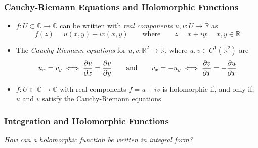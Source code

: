 \documentclass[11pt, a4paper]{article}
\newcommand{\question}[1]{\textit{#1}\vspace{2mm}}
\newcommand{\R}{\mathbb{R}} %
\newcommand{\C}{\mathbb{C}} %
\begin{document}
\subsubsection{Cauchy-Riemann Equations and Holomorphic Functions}
\begin{itemize}
	\item $ f : U \subset \C \to \C $ can be written with \textit{real components} $ u, v : U \to \R $ as
	\begin{equation*}
		f(z) = u(x, y) + iv(x, y) \qquad \text{where} \qquad z = x + iy; \quad x, y \in \R
	\end{equation*}
	
	\item The \textit{Cauchy-Riemann equations} for $ u, v: \R^2 \to \R $, where $ u, v \in C^{1}(\R^{2}) $ are
	\begin{equation*}
		u_{x} = v_{y} \iff \pdv{u}{x} = \pdv{v}{y} \qquad \text{and} \qquad v_{x} = - u_{y} \iff \pdv{v}{x} = -\pdv{u}{x}
	\end{equation*}
	
	\item $ f : U \subset \C \to \C $ with real components $ f = u + iv $ is holomorphic if, and only if, $ u $ and $ v $ satisfy the Cauchy-Riemann equations
\end{itemize}

\subsubsection{Integration and Holomorphic Functions}
\question{How can a holomorphic function be written in integral form? }
\end{document}
